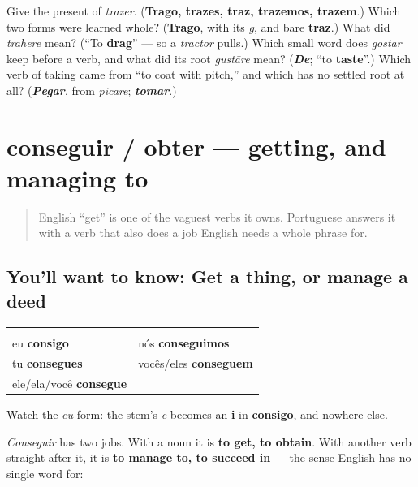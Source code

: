 \begin{tcolorbox}[breakable,colback=teal!4,colframe=teal!35!black,title={Before you move on}]
Give the present of \emph{trazer}. (\textbf{Trago, trazes, traz, trazemos, trazem}.) Which two forms were learned whole? (\textbf{Trago}, with its \emph{g}, and bare \textbf{traz}.) What did \emph{trahere} mean? (\textquotedblleft{}To \textbf{drag}\textquotedblright{} — so a \emph{tractor} pulls.) Which small word does \emph{gostar} keep before a verb, and what did its root \emph{gustāre} mean? (\emph{\textbf{De}}; \textquotedblleft{}to \textbf{taste}\textquotedblright{}.) Which verb of taking came from \textquotedblleft{}to coat with pitch,\textquotedblright{} and which has no settled root at all? (\emph{\textbf{Pegar}}, from \emph{picāre}; \emph{\textbf{tomar}}.)
\end{tcolorbox}
\section[conseguir / obter]{conseguir / obter — getting, and managing to}

\label{lesson:PT-C21-conseguir}



\begin{quote}
English \textquotedblleft{}get\textquotedblright{} is one of the vaguest verbs it owns. Portuguese answers it with a verb that also does a job English needs a whole phrase for.
\end{quote}

\subsection*{You'll want to know: Get a thing, or manage a deed}
\noindent
\begin{tabularx}{\linewidth}{@{}>{\raggedright\arraybackslash}X>{\raggedright\arraybackslash}X@{}}
\toprule
\textbf{} & \textbf{} \\
\midrule
eu \textbf{consigo} & nós \textbf{conseguimos} \\
tu \textbf{consegues} & vocês/eles \textbf{conseguem} \\
ele/ela/você \textbf{consegue} &  \\
\bottomrule
\end{tabularx}

Watch the \emph{eu} form: the stem's \emph{e} becomes an \textbf{i} in \textbf{consigo}, and nowhere else.

\emph{Conseguir} has two jobs. With a noun it is \textbf{to get, to obtain}. With another verb straight after it, it is \textbf{to manage to, to succeed in} — the sense English has no single word for:

